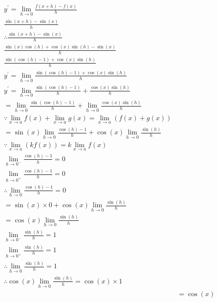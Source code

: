 \documentclass[12pt letter]{report}
\begin{document}
\begin{myproof}
	\begin{align*}
		y^{\prime} = \lim_{h \to 0} \frac{f(x+h) -f(x)}{h}                                              \\
		\frac{\sin(x+h) -\sin(x)}{h}                                                                    \\
		\therefore \frac{\sin(x+h) -\sin(x)}{h}                                                         \\
		\frac{\sin(x)\cos\left(h\right) + \cos\left(x\right)\sin\left(h\right) - \sin\left(x\right)}{h} \\
		\frac{\sin(\cos(h)-1) + \cos(x)\sin(h)}{h}                                                      \\
		y^{\prime} = \lim_{h \to 0} \frac{\sin(\cos(h)-1) + \cos(x)\sin(h)}{h}                          \\
		y^{\prime} = \lim_{h \to 0} \frac{\sin(\cos(h) -1 )}{h} + \frac{\cos(x)\sin(h)}{h}              \\
		= \lim_{h \to 0} \frac{\sin(\cos(h) -1 )}{h} + \lim_{h \to 0} \frac{\cos(x)\sin(h)}{h}          \\[20pt]
		\because \lim_{x \to a} f(x) + \lim_{x \to a} g(x) = \lim_{x \to a}(f(x) + g(x))                \\[20pt]
		= \sin(x)\lim_{h \to 0}  \frac{\cos(h) -1 }{h} + \cos(x)\lim_{h \to 0} \frac{\sin(h)}{h}        \\[20pt]
		\because \lim_{x \to a} (kf(x)) = k \lim_{x \to a} f(x)                                         \\[20pt]
		\lim_{h \to 0^{-}}\frac{\cos(h) -1 }{h} = 0                                                     \\
		\lim_{h \to 0^{+}} \frac{\cos(h) -1 }{h} = 0                                                    \\
		\therefore  \lim_{h \to 0} \frac{\cos(h) -1 }{h} =  0                                           \\
		= \sin(x) \times 0 +\cos(x)\lim_{h \to 0} \frac{\sin(h)}{h}                                     \\
		= \cos(x)\lim_{h \to 0} \frac{\sin(h)}{h}                                                       \\
		\lim_{h \to 0^{-}} \frac{\sin(h)}{h} = 1                                                        \\
		\lim_{h \to 0^{+}} \frac{\sin(h)}{h} = 1                                                        \\[20pt]
		\therefore \lim_{h \to 0} \frac{\sin(h)}{h} = 1                                                 \\
		\therefore \cos(x)\lim_{h \to 0} \frac{\sin(h)}{h} = \cos(x) \times 1                           \\[20pt]
		 & = \cos(x)                                                                                    \\
	\end{align*}
\end{myproof}
\end{document}

